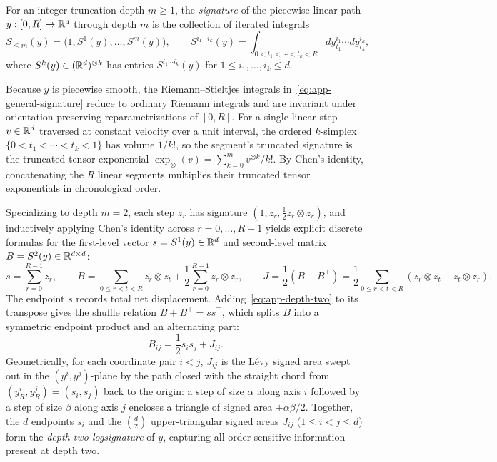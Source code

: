 \begin{definition}\label{def:signature}
For an integer truncation depth \(m \geq 1\), the \emph{signature} of the
piecewise-linear path \(y:[0,R]\to\mathbb{R}^d\) through depth \(m\) is the collection
of iterated integrals
\begin{equation}\label{eq:app-general-signature}
 S_{\leq m}(y) = \bigl(1, S^1(y), \ldots, S^m(y)\bigr), \qquad
 S^{i_1 \cdots i_k}(y) = \int_{0 < t_1 < \cdots < t_k < R}
 dy^{i_1}_{t_1} \cdots dy^{i_k}_{t_k},
\end{equation}
where \(S^k(y) \in (\mathbb{R}^d)^{\otimes k}\) has entries \(S^{i_1 \cdots i_k}(y)\) for
\(1 \leq i_1, \ldots, i_k \leq d\).
\end{definition}

Because \(y\) is piecewise smooth, the Riemann--Stieltjes integrals
in~\eqref{eq:app-general-signature} reduce to ordinary Riemann integrals and
are invariant under orientation-preserving reparametrizations of \([0,R]\). For a
single linear step \(v \in \mathbb{R}^d\) traversed at constant velocity over a unit
interval, the ordered \(k\)-simplex \(\{0 < t_1 < \cdots < t_k < 1\}\) has
volume \(1/k!\), so the segment's truncated signature is the truncated tensor
exponential \(\exp_\otimes(v) = \sum_{k=0}^m v^{\otimes k} / k!\). By Chen's
identity, concatenating the \(R\) linear segments multiplies their truncated
tensor exponentials in chronological order.

Specializing to depth \(m=2\), each step \(z_r\) has signature
\((1, z_r, \tfrac12 z_r \otimes z_r)\), and inductively applying Chen's identity
across \(r = 0, \ldots, R-1\) yields explicit discrete formulas for the
first-level vector \(s = S^1(y) \in \mathbb{R}^d\) and second-level matrix
\(B = S^2(y) \in \mathbb{R}^{d \times d}\):
\begin{equation}\label{eq:app-depth-two}
 s = \sum_{r=0}^{R-1} z_r, \qquad
 B = \sum_{0 \leq r < t < R} z_r \otimes z_t
   + \frac{1}{2}\sum_{r=0}^{R-1} z_r \otimes z_r, \qquad
 J = \frac{1}{2}(B - B^\top)
   = \frac{1}{2}\sum_{0 \leq r < t < R} (z_r \otimes z_t - z_t \otimes z_r).
\end{equation}
The endpoint \(s\) records total net displacement. Adding~\eqref{eq:app-depth-two}
to its transpose gives the shuffle relation \(B + B^\top = s s^\top\), which
splits \(B\) into a symmetric endpoint product and an alternating part:
\[
 B_{ij} = \frac{1}{2} s_i s_j + J_{ij}.
\]
Geometrically, for each coordinate pair \(i < j\), \(J_{ij}\) is the L\'evy
signed area swept out in the \((y^i, y^j)\)-plane by the path closed with the
straight chord from \((y^i_R, y^j_R) = (s_i, s_j)\) back to the origin: a step
of size \(\alpha\) along axis \(i\) followed by a step of size \(\beta\) along
axis \(j\) encloses a triangle of signed area \(+\alpha\beta/2\). Together, the
\(d\) endpoints \(s_i\) and the \(\binom{d}{2}\) upper-triangular signed areas
\(J_{ij}\) (\(1 \leq i < j \leq d\)) form the \emph{depth-two logsignature} of
\(y\), capturing all order-sensitive information present at depth two.


